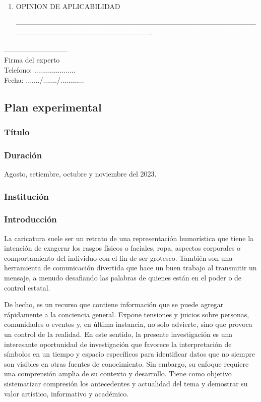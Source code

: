 \documentclass[12pt,a4paper]{article}
\begin{document}
\begin{enumerate}
	\item OPINION DE APLICABILIDAD

	      ----------------------------------------------------------------------------------------------------------------------------------------------------------------
\end{enumerate}

\begin{center}

	---------------------------\\
	Firma del experto\\
	Telefono: .....................\\
	Fecha: ......./......./............
\end{center}


\subsection{Plan experimental}
\subsubsection{Título} \titulo
\subsubsection{Duración} Agosto, setiembre, octubre y noviembre del 2023.
\subsubsection{Institución} \lugar
\subsubsection{Introducción}

La caricatura suele ser un retrato de una representación humorística que tiene la intención de exagerar los rasgos físicos o faciales, ropa, aspectos corporales o comportamiento del individuo con el fin de ser grotesco.  También son una herramienta de comunicación divertida que hace un buen trabajo al transmitir un mensaje, a menudo desafiando las palabras de quienes están en el poder o de control estatal.

De hecho, es un recurso que contiene información que se puede agregar rápidamente a la conciencia general. Expone tensiones y juicios sobre personas, comunidades o eventos y, en última instancia, no solo advierte, sino que provoca un control de la realidad. En este sentido, la presente investigación es una interesante oportunidad de investigación que favorece la interpretación de símbolos en un tiempo y  espacio específicos para identificar datos que no siempre son visibles en otras fuentes de conocimiento. Sin embargo, su enfoque requiere una comprensión amplia de su contexto y desarrollo. Tiene como objetivo sistematizar compresión los antecedentes y actualidad del tema y demostrar su valor artístico, informativo y académico.
\end{document}
